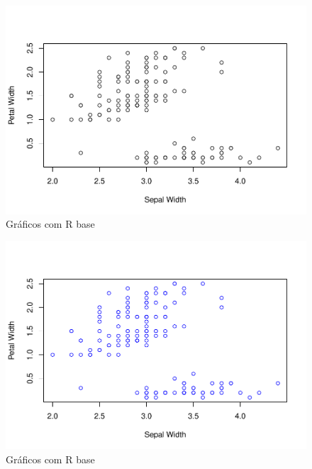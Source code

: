 \documentclass[
]{book}
\newenvironment{Shaded}{\begin{snugshade}}{\end{snugshade}}
\newcommand{\AttributeTok}[1]{\textcolor[rgb]{0.13,0.29,0.53}{#1}}
\newcommand{\CommentTok}[1]{\textcolor[rgb]{0.56,0.35,0.01}{\textit{#1}}}
\newcommand{\FunctionTok}[1]{\textcolor[rgb]{0.13,0.29,0.53}{\textbf{#1}}}
\newcommand{\NormalTok}[1]{#1}
\newcommand{\SpecialCharTok}[1]{\textcolor[rgb]{0.81,0.36,0.00}{\textbf{#1}}}
\newcommand{\StringTok}[1]{\textcolor[rgb]{0.31,0.60,0.02}{#1}}
\begin{document}
\begin{figure}
\centering
\includegraphics{_main_files/figure-latex/nome-do-chunk2-3.pdf}
\caption{\label{fig:nome-do-chunk2-3}Gráficos com R base}
\end{figure}

\begin{Shaded}
\end{Shaded}

\begin{figure}
\centering
\includegraphics{_main_files/figure-latex/nome-do-chunk2-4.pdf}
\caption{\label{fig:nome-do-chunk2-4}Gráficos com R base}
\end{figure}
\end{document}
